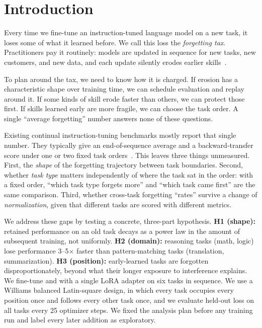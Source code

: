 \section{Introduction}
\label{sec:intro}

Every time we fine-tune an instruction-tuned language model on a new task, it loses some of what it learned before.
We call this loss the \emph{forgetting tax}.
Practitioners pay it routinely: models are updated in sequence for new tasks, new customers, and new data, and each update silently erodes earlier skills~\cite{mccloskey1989catastrophic,luo2023empirical}.

To plan around the tax, we need to know how it is charged.
If erosion has a characteristic shape over training time, we can schedule evaluation and replay around it.
If some kinds of skill erode faster than others, we can protect those first.
If skills learned early are more fragile, we can choose the task order.
A single ``average forgetting'' number answers none of these questions.

Existing continual instruction-tuning benchmarks mostly report that single number.
They typically give an end-of-sequence average and a backward-transfer score under one or two fixed task orders~\cite{wang2023trace,zhang2023citb,scialom2022fine,luo2023empirical}.
This leaves three things unmeasured.
First, the \emph{shape} of the forgetting trajectory between task boundaries.
Second, whether \emph{task type} matters independently of where the task sat in the order: with a fixed order, ``which task type forgets more'' and ``which task came first'' are the same comparison.
Third, whether cross-task forgetting ``rates'' survive a change of \emph{normalization}, given that different tasks are scored with different metrics.

We address these gaps by testing a concrete, three-part hypothesis.
{\bf H1 (shape):} retained performance on an old task decays as a power law in the amount of subsequent training, not uniformly.
{\bf H2 (domain):} reasoning tasks (math, logic) lose performance 3--5$\times$ faster than pattern-matching tasks (translation, summarization).
{\bf H3 (position):} early-learned tasks are forgotten disproportionately, beyond what their longer exposure to interference explains.
We fine-tune \llama and \qwen with a single LoRA adapter on six tasks in sequence.
We use a Williams balanced Latin-square design, in which every task occupies every position once and follows every other task once, and we evaluate held-out loss on all tasks every 25 optimizer steps.
We fixed the analysis plan before any training run and label every later addition as exploratory.

